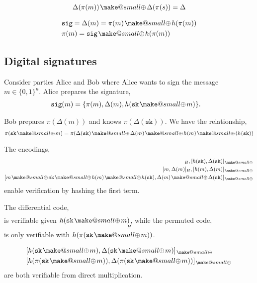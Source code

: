 \documentclass[twocolumn, aps, amsmath, amssymb, nofootinbib, superscriptaddress, longbibliography, doublefloatfix, table-of-contents, eqsecnum, rmp]{revtex4-2}
\makeatletter
\newcommand{\soplus}{{{\hspace{1pt}}{\mathbin{\mathpalette\make@small{\mathbin\oplus}}}}{\hspace{1pt}}}
\newcommand{\make@small}[2]{%
  \vcenter{\hbox{%
    \scalebox{0.6}{$\m@th#1#2$}%
  }}%
}
\makeatother
\begin{document}
\begin{align}
	\Delta(\pi(m))\soplus \Delta(\pi(s))	= \Delta
\end{align}


\begin{align}
	&\mathtt{sig} = \Delta(m) = \pi(m) \soplus h(\pi(m)) \nonumber\\
	&\pi(m) = \mathtt{sig} \soplus h(\pi(m)) 
\end{align}

\subsection{Digital signatures}

Consider parties Alice and Bob where Alice wants to sign the message \mbox{$m\in \{0,1\}^n$}. Alice prepares the signature,
\begin{align}
	\mathtt{sig}(m) &= \{\pi(m), \Delta(m), h(\mathtt{sk} \soplus m)\}.
\end{align}

Bob prepares $\pi(\Delta(m))$ and knows $\pi(\Delta(\mathtt{sk}))$. We have the relationship,
\begin{align}
	\pi(\mathtt{sk} \soplus m) = \pi(\Delta(\mathtt{sk}) \soplus \Delta(m) \soplus h(m) \soplus(h(\mathtt{sk}))%
\end{align}

The encodings,
\begin{align}
	[\mathtt{sk}, \Delta(\mathtt{sk})]_H, [h(\mathtt{sk}), \Delta(\mathtt{sk})]_\soplus \nonumber\\
	[m, \Delta(m)]_H, [h(m), \Delta(m)]_\soplus \nonumber\\
	[m \soplus \mathtt{sk} \soplus h(m) \soplus h(\mathtt{sk}), \Delta(m) \soplus \Delta(\mathtt{sk})]_\soplus
\end{align}
enable verification by hashing the first term.

The differential code,
\begin{align}
	[\mathtt{sk} \soplus m, \Delta(\mathtt{sk} \soplus m)] %
\end{align}
is verifiable given $h(\mathtt{sk} \soplus m)$, while the permuted code,
\begin{align}
	[\pi(\mathtt{sk} \soplus m), \Delta(\pi(\mathtt{sk} \soplus m))]_H 
\end{align}
is only verifiable with $h(\pi(\mathtt{sk} \soplus m))$.

\begin{align}
	&[h(\mathtt{sk} \soplus m), \Delta(\mathtt{sk} \soplus m)]_\soplus \nonumber\\
	&[h(\pi(\mathtt{sk} \soplus m)), \Delta(\pi(\mathtt{sk} \soplus m))]_\soplus
\end{align}
are both verifiable from direct multiplication.
\end{document}
